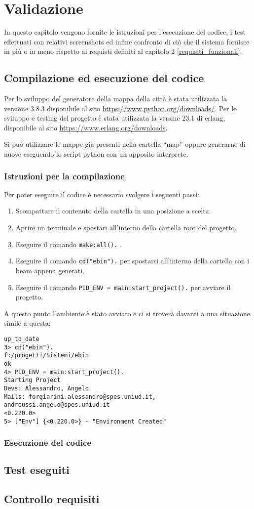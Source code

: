 
\chapter{Validazione}

In questo capitolo vengono fornite le istruzioni per l'esecuzione del codice, i test effettuati con relativi screenshots ed infine confronto di ciò che il sistema fornisce in più o in meno rispetto ai requisti definiti al capitolo 2 \ref{requisiti_funzionali}.

\section{Compilazione ed esecuzione del codice}
Per lo sviluppo del generatore della mappa della città è stata utilizzata la versione 3.8.3 disponibile al sito \url{https://www.python.org/downloads/}.
Per lo sviluppo e testing del progetto è stata utilizzata la versine 23.1 di erlang, disponibile al sito \url{https://www.erlang.org/downloads}.

Si può utilizzare le mappe già presenti nella cartella ``map'' oppure generarne di nuove eseguendo lo script python con un apposito interprete.
\subsection{Istruzioni per la compilazione}\label{istruzioni_compilazione}
Per poter eseguire il codice è necessario svolgere i seguenti passi:
\begin{enumerate}
	\item Scompattare il contenuto della cartella in una posizione a scelta.
	\item Aprire un terminale e spostari all'interno della cartella root del progetto.
	\item Eseguire il comando \lstinline |make:all().| .
	\item Eseguire il comando \lstinline |cd("ebin").| per spostarsi all'interno della cartella con i beam appena generati.
	\item Eseguire il comando \lstinline |PID_ENV = main:start_project().| per avviare il progetto.
\end{enumerate}
A questo punto l'ambiente è stato avviato e ci si troverà davanti a una situazione simile a questa:

\begin{lstlisting}
up_to_date
3> cd("ebin").
f:/progetti/Sistemi/ebin
ok
4> PID_ENV = main:start_project().
Starting Project
Devs: Alessandro, Angelo
Mails: forgiarini.alessandro@spes.uniud.it, andreussi.angelo@spes.uniud.it
<0.220.0>
5> ["Env"] {<0.220.0>} - "Environment Created"
\end{lstlisting}

\subsection{Esecuzione del codice}


\section{Test eseguiti}

\section{Controllo requisiti}